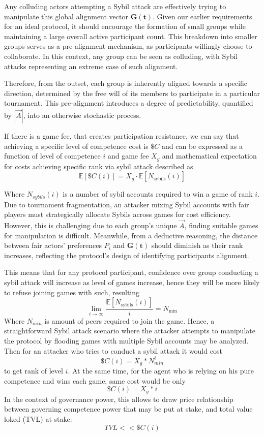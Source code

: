\documentclass{article}
\begin{document}
\begin{CJK}{UTF8}{gbsn}
\begin{multicols}{2}
        Any colluding actors attempting a Sybil attack are effectively trying to manipulate this global alignment vector $\mathbf{G(t)}$. Given our earlier requirements for an ideal protocol, it should encourage the formation of small groups while maintaining a large overall active participant count. This breakdown into smaller groups serves as a pre-alignment mechanism, as participants willingly choose to collaborate. In this context, any group can be seen as colluding, with Sybil attacks representing an extreme case of such alignment.

        Therefore, from the outset, each group is inherently aligned towards a specific direction, determined by the free will of its members to participate in a particular tournament. This pre-alignment introduces a degree of predictability, quantified by $|\vec{A}|$, into an otherwise stochastic process.


        If there is a game fee, that creates participation resistance, we can say that achieving a specific level of competence cost is $\$C$ and can be expressed as a function of level of competence $i$ and game fee $X_g$ and mathematical expectation for costs achieving specific rank via sybil attack described as
            $$\mathbb{E}[\$C(i)] = X_g \cdot \mathbb{E}[N_{\text{sybils}}(i)]$$


            Where $N_{sybils}(i)$ is a number of sybil accounts required to win a game of rank $i$. Due to tournament fragmentation, an attacker mixing Sybil accounts with fair players must strategically allocate Sybils across games for cost efficiency. However, this is challenging due to each group's unique $\vec{A}$, finding suitable games for manipulation is difficult.  Meanwhile, from a deductive reasoning, the distance between fair actors' preferences $P_i$ and $\mathbf{G(t)}$ should diminish as their rank increases, reflecting the protocol's design of identifying participants alignment.


            This means that for any protocol participant, confidence over group conducting a sybil attack will increase as level of games increase, hence they will be more likely to refuse joining games with such, resulting $$\lim_{i \to \infty} \frac{\mathbb{E}[N_{\text{sybils}}(i)]}{i} = N_{\text{min}}$$ Where $N_{min}$ is amount of peers required to join the game. Hence, a straightforward Sybil attack scenario where the attacker attempts to manipulate the protocol by flooding games with multiple Sybil accounts may be analyzed.
            Then for an attacker who tries to conduct a sybil attack it would cost
            $$\$C(i) = X_g*N_{min}^i$$ to get rank of level $i$. At the same time, for the agent who is relying on his pure competence and wins each game, same cost would be only $$\$C(i) = X_g*i$$
            In the context of governance power, this allows to draw price relationship between governing competence power that may be put at stake, and total value loked (TVL) at stake: $$TVL << \$C(i)$$



\end{multicols}
\end{CJK}
\end{document}
